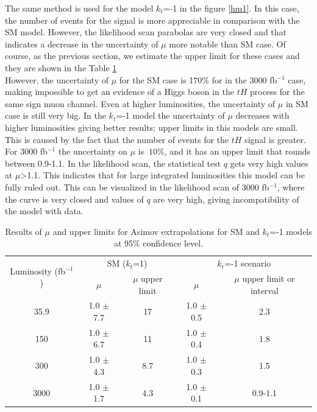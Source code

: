 	The same method is used for the model $k_t$=-1 in the figure \ref{hm1}. In this case, the number of events for the signal is more appreciable in comparison with the SM model. However, the likelihood scan parabolas are very closed and that indicates a decrease in the uncertainty of $\mu$ more notable than SM case. 
	Of course, as the previous section, we estimate the upper limit for these cases and they are shown in the Table \ref{upper}\\
	
	However, the uncertainty of $\mu$ for the SM case is 170$\%$ for  in the 3000 fb$^{-1}$ case, making impossible to get an evidence of a Higgs boson in the $tH$ process for the same sign muon channel. Even at higher luminosities, the uncertainty of $\mu$ in SM case is still very big.
	In the $k_t$=-1 model the uncertainty of $\mu$ decreases with higher luminosities giving better results; upper limits in this models are small. This is caused by the fact that the number of events for the $tH$ signal is greater. For 3000 fb$^{-1}$ the uncertainty on $\mu$ is $~10\%$, and it has an upper limit that rounds between 0.9-1.1. In the likelihood scan, the statistical test $q$ gets very high values at $\mu$>1.1. This indicates that for large integrated luminosities this model can be fully ruled out. This can be visualized in the likelihood scan of  3000 fb$^{-1}$, where the curve is very closed and values of $q$ are very high, giving incompatibility of the model with data.

	\begin{table}[ht!]
		\caption{Results of $\mu$ and upper limits for Asimov extrapolations for SM  and $k_t$=-1 models at 95$\%$ confidence level.}
		\begin{tabular}{|c|c|c|c|c|}
			\hline
			\multirow{2}{*}{Luminosity (fb$^{-1}$)}  &\multicolumn{2}{c|}{SM ($k_t$=1)} &\multicolumn{2}{c|}{$k_t$=-1 scenario}\\

		          \hhline{~----}	&$\mu$  &$\mu$ upper limit & $\mu$ &$\mu$ upper limit or interval\\
			\hline
			35.9 & 1.0 $\pm$ 7.7 & 17 & 1.0 $\pm$ 0.5 & 2.3 \\
			\hline
			150& 1.0 $\pm$ 6.7& 11 & 1.0 $\pm$ 0.4 &1.8\\
			\hline
			300&1.0 $\pm$ 4.3 &8.7 & 1.0 $\pm$ 0.3 &1.5 \\
			\hline
			3000&1.0 $\pm$ 1.7 & 4.3 &	 1.0 $\pm$ 0.1 & 0.9-1.1\\
			\hline
		\end{tabular}
		\label{upper}
	\end{table}
	
